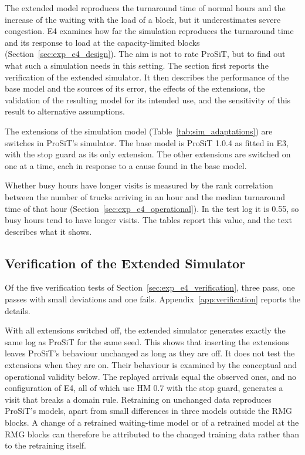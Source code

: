 The extended model reproduces the turnaround time of normal hours and the increase of
the waiting with the load of a block, but it underestimates severe congestion. E4
examines how far the simulation reproduces the turnaround time and its response to
load at the capacity-limited blocks (Section~\ref{sec:exp_e4_design}). The aim is
not to rate ProSiT, but to find out what such a simulation needs in this setting.
The section first reports the verification of the extended simulator. It then
describes the performance of the base model and the sources of its error, the effects
of the extensions, the validation of the resulting model for its intended use, and
the sensitivity of this result to alternative assumptions.

The extensions of the simulation model (Table~\ref{tab:sim_adaptations}) are switches
in ProSiT's simulator. The base model is ProSiT 1.0.4 as fitted in E3, with the stop
guard as its only extension. The other extensions are switched on one at a time, each in
response to a cause found in the base model.

Whether busy hours have longer visits is measured by the rank correlation between
the number of trucks arriving in an hour and the median turnaround time of that hour
(Section~\ref{sec:exp_e4_operational}). In the test log it is 0.55, so busy hours tend
to have longer visits. The tables report this value, and the text describes what it
shows.

\subsection{Verification of the Extended Simulator}
\label{sec:res_e4_verification}

Of the five verification tests of Section~\ref{sec:exp_e4_verification}, three pass,
one passes with small deviations and one fails. Appendix~\ref{app:verification}
reports the details.

With all extensions switched off, the extended simulator generates exactly the same
log as ProSiT for the same seed. This shows that inserting the extensions leaves
ProSiT's behaviour unchanged as long as they are off. It does not test the extensions
when they are on. Their behaviour is examined by the conceptual and operational
validity below. The replayed arrivals equal the observed ones, and no configuration of
E4, all of which use HM 0.7 with the stop guard, generates a visit that breaks a
domain rule. Retraining on unchanged data reproduces ProSiT's models, apart from small
differences in three models outside the RMG blocks. A change of a retrained
waiting-time model or of a retrained model at the RMG blocks can therefore be
attributed to the changed training data rather than to the retraining itself.

